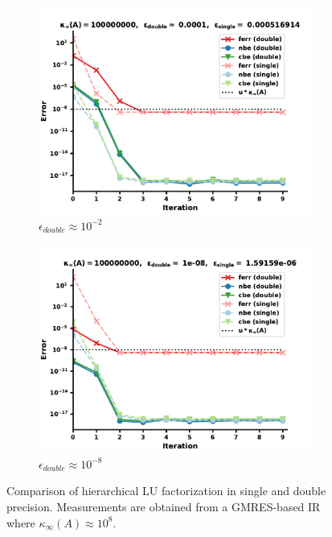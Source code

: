 \begin{figure}
\centering
\begin{subfigure}{.5\textwidth}
  \centering
  \includegraphics[width=\linewidth]{chapters/5_experiments/figures/GMRES512_e3_0s.pdf}
  \caption{$\epsilon_{double} \approx 10^{-2}$}
  \label{fig:lrirsg3_1}
\end{subfigure}%
\begin{subfigure}{.5\textwidth}
  \centering
  \includegraphics[width=\linewidth]{chapters/5_experiments/figures/GMRES512_e3_1s.pdf}
  \caption{$\epsilon_{double} \approx 10^{-8}$}
  \label{fig:lrirsg3_2}
\end{subfigure}
\caption[Mixed Precision Low-Rank GMRES-IR 3]{Comparison of hierarchical LU factorization in single and double precision. Measurements are obtained from a GMRES-based IR where $\kappa_\infty(A) \approx 10^8$.}
\label{fig:lrirsg3}
\end{figure}


